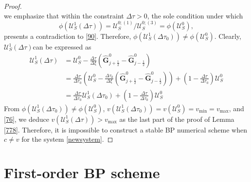 \documentclass[times,final,11pt]{elsarticle}
\numberwithin{equation}{section}
\theoremstyle{definition}
\theoremstyle{remark}
\begin{document}
\begin{proof}
\begin{equation*}
	\end{equation*}
	we emphasize that within the constraint $\Delta \tau > 0$, the sole condition under which 
	\begin{equation*}
		\phi \left( \boldsymbol{\mathcal{U}}_S^{1}(\Delta \tau) \right) = \boldsymbol{\mathcal{U}}_S^{0;(1)} / \boldsymbol{\mathcal{U}}_S^{0;(3)} = \phi \left( \boldsymbol{\mathcal{U}}_S^{0} \right),
	\end{equation*}
	presents a contradiction to \eqref{90}. Therefore, $\phi \left( \boldsymbol{\mathcal{U}}_S^{1}(\Delta \tau_0) \right) \neq \phi \left( \boldsymbol{\mathcal{U}}_S^{0} \right)$. Clearly, $\boldsymbol{\mathcal{U}}_S^{1}(\Delta \tau) $can be expressed as 
	\begin{equation}
	\label{76}
		\begin{aligned}
			\boldsymbol{\mathcal{U}}_S^{1}(\Delta \tau) 
			&= \boldsymbol{\mathcal{U}}_S^0 - \frac{\Delta \tau}{\Delta \xi} \left( \widehat{\mathbf{G}}_{j + \frac{1}{2}}^0 - \widehat{\mathbf{G}}_{j - \frac{1}{2}}^0 \right) \\
			&= \frac{\Delta \tau}{\Delta \tau_0} \left( \boldsymbol{\mathcal{U}}_S^0 - \frac{\Delta \tau_0}{\Delta \xi} \left( \widehat{\mathbf{G}}_{j + \frac{1}{2}}^0 - \widehat{\mathbf{G}}_{j - \frac{1}{2}}^0 \right)\right) 
			+ \left( 1 - \frac{\Delta \tau}{\Delta \tau_0}\right)\boldsymbol{\mathcal{U}}_S^0\\
			&=\frac{\Delta \tau}{\Delta \tau_0}\boldsymbol{\mathcal{U}}_S^{1}(\Delta \tau_0) + \left( 1 - \frac{\Delta \tau}{\Delta \tau_0}\right) \boldsymbol{\mathcal{U}}_S^{0}
		\end{aligned} 
	\end{equation}
	From $\phi \left( \boldsymbol{\mathcal{U}}_S^{1}(\Delta \tau_0) \right) \neq \phi \left( \boldsymbol{\mathcal{U}}_S^{0} \right)$, $v \left( \boldsymbol{\mathcal{U}}_S^{1}(\Delta \tau_0) \right) = v \left( \boldsymbol{\mathcal{U}}_S^{0} \right) = v_{\min} = v_{\max}$, and \eqref{76}, we deduce $v \left(\boldsymbol{\mathcal{U}}^1_S (\Delta \tau) \right) > v_{\max}$ as the last part of the proof of Lemma \ref{778}. Therefore, it is impossible to construct a stable BP numerical scheme when $c \neq v$ for the system \eqref{newsystem}.
\end{proof}


\section{First-order BP scheme}\label{0sec3}
\end{document}
